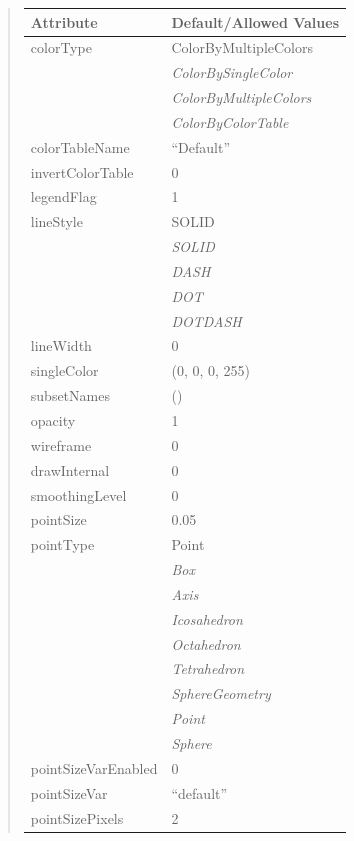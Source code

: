 \documentclass[letterpaper,10pt,english]{sphinxmanual}
\begin{document}
\begin{quote}
\begin{longtable}{|l|l|}
\textbf{Attribute}
 & 
\textbf{Default/Allowed Values}
\\
\hline
colorType
 & 
ColorByMultipleColors
\\
\hline & 
\emph{ColorBySingleColor}
\\
\hline & 
\emph{ColorByMultipleColors}
\\
\hline & 
\emph{ColorByColorTable}
\\
\hline
colorTableName
 & 
``Default''
\\
\hline
invertColorTable
 & 
0
\\
\hline
legendFlag
 & 
1
\\
\hline
lineStyle
 & 
SOLID
\\
\hline & 
\emph{SOLID}
\\
\hline & 
\emph{DASH}
\\
\hline & 
\emph{DOT}
\\
\hline & 
\emph{DOTDASH}
\\
\hline
lineWidth
 & 
0
\\
\hline
singleColor
 & 
(0, 0, 0, 255)
\\
\hline
subsetNames
 & 
()
\\
\hline
opacity
 & 
1
\\
\hline
wireframe
 & 
0
\\
\hline
drawInternal
 & 
0
\\
\hline
smoothingLevel
 & 
0
\\
\hline
pointSize
 & 
0.05
\\
\hline
pointType
 & 
Point
\\
\hline & 
\emph{Box}
\\
\hline & 
\emph{Axis}
\\
\hline & 
\emph{Icosahedron}
\\
\hline & 
\emph{Octahedron}
\\
\hline & 
\emph{Tetrahedron}
\\
\hline & 
\emph{SphereGeometry}
\\
\hline & 
\emph{Point}
\\
\hline & 
\emph{Sphere}
\\
\hline
pointSizeVarEnabled
 & 
0
\\
\hline
pointSizeVar
 & 
``default''
\\
\hline
pointSizePixels
 & 
2
\\
\hline\end{longtable}

\end{quote}

\begin{DUlineblock}{0em}
\item[] 
\end{DUlineblock}
\end{document}
